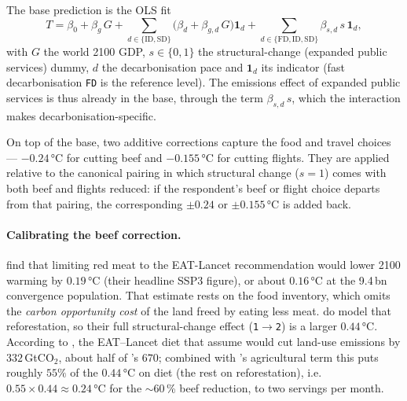 \documentclass[12pt,a4paper]{article}
\newcommand{\scenario}[1]{\texttt{#1}}
\begin{document}
The base prediction is the OLS fit
\[
  T = \beta_0 + \beta_g\,G + \sum_{d\in\{\mathrm{ID},\mathrm{SD}\}}\!\bigl(\beta_d+\beta_{g,d}\,G\bigr)\mathbf 1_{d}
      + \sum_{d\in\{\mathrm{FD},\mathrm{ID},\mathrm{SD}\}}\!\beta_{s,d}\,s\,\mathbf 1_{d},
\]
with $G$ the world 2100 GDP, $s\in\{0,1\}$ the structural-change (expanded public services) dummy, $d$ the decarbonisation pace and $\mathbf 1_d$ its indicator (fast decarbonisation \scenario{FD} is the reference level). The emissions effect of expanded public services is thus already in the base, through the term $\beta_{s,d}\,s$, which the interaction makes decarbonisation-specific.

On top of the base, two additive corrections capture the food and travel choices --- $-0.24$\,°C for cutting beef and $-0.155$\,°C for cutting flights. They are applied relative to the canonical pairing in which structural change ($s=1$) comes with both beef and flights reduced: if the respondent's beef or flight choice departs from that pairing, the corresponding $\pm0.24$ or $\pm0.155$\,°C is added back.

\paragraph{Calibrating the beef correction.} \citet{Ivanovich2023} find that limiting red meat to the EAT-Lancet recommendation would lower 2100 warming by $0.19$\,°C (their headline SSP3 figure), or about $0.16$\,°C at the 9.4\,bn convergence population. That estimate rests on the \citet{PooreNemecek2018} food inventory, which omits the \emph{carbon opportunity cost} of the land freed by eating less meat. \citet{Chancel2026} do model that reforestation, so their full structural-change effect (\scenario{1}$\to$\scenario{2}) is a larger $0.44$\,°C. According to \citet{Hayek2021}, the EAT--Lancet diet \citep{Willett2019} that \citeauthor{Chancel2026} assume would cut land-use emissions by $332$\,GtCO$_2$, about half of \citeauthor{Chancel2026}'s $670$; combined with \citeauthor{Chancel2026}'s agricultural term this puts roughly $55\%$ of the $0.44$\,°C on diet (the rest on reforestation), i.e.\ $0.55\times0.44\approx\mathbf{0.24}$\,°C for the $\sim$60\,\% beef reduction, to two servings per month.
\end{document}
